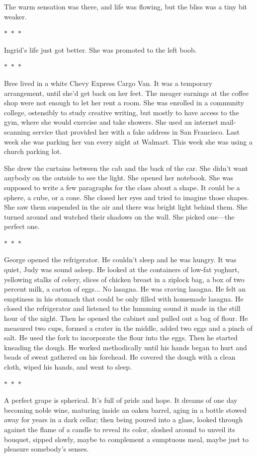 \documentclass{memoir}
\newcommand{\starbreak}{%
\begin{center}
  $\ast$~$\ast$~$\ast$
\end{center}
}
\begin{document}
The warm sensation was there, and life was flowing, but the bliss was a tiny bit weaker. 

\starbreak

Ingrid's life just got better. She was promoted to the left boob.

\starbreak

Bree lived in a white Chevy Express Cargo Van. It was a temporary arrangement, until she'd get back on her feet. The meager earnings at the coffee shop were not enough to let her rent a room. She was enrolled in a community college, ostensibly to study creative writing, but mostly to have access to the gym, where she would exercise and take showers. She used an internet mail-scanning service that provided her with a fake address in San Francisco. Last week she was parking her van every night at Walmart. This week she was using a church parking lot.

She drew the curtains between the cab and the back of the car. She didn't want anybody on the outside to see the light. She opened her notebook. She was supposed to write a few paragraphs for the class about a shape. It could be a sphere, a cube, or a cone. She closed her eyes and tried to imagine those shapes. She saw them suspended in the air and there was bright light behind them. She turned around and watched their shadows on the wall. She picked one---the perfect one. 

\starbreak

George opened the refrigerator. He couldn't sleep and he was hungry. It was quiet, Judy was sound asleep. He looked at the containers of low-fat yoghurt, yellowing stalks of celery, slices of chicken breast in a ziplock bag, a box of two percent milk, a carton of eggs... No lasagna. He was craving lasagna. He felt an emptiness in his stomach that could be only filled with homemade lasagna. He closed the refrigerator and listened to the humming sound it made in the still hour of the night. Then he opened the cabinet and pulled out a bag of flour. He measured two cups, formed a crater in the middle, added two eggs and a pinch of salt. He used the fork to incorporate the flour into the eggs. Then he started kneading the dough. He worked methodically until his hands began to hurt and beads of sweat gathered on his forehead. He covered the dough with a clean cloth, wiped his hands, and went to sleep.

\starbreak

A perfect grape is spherical. It's full of pride and hope. It dreams of one day becoming noble wine, maturing inside an oaken barrel, aging in a bottle stowed away for years in a dark cellar; then being poured into a glass, looked through against the flame of a candle to reveal its color, sloshed around to unveil its bouquet, sipped slowly, maybe to complement a sumptuous meal, maybe just to pleasure somebody's senses. 
\end{document}
